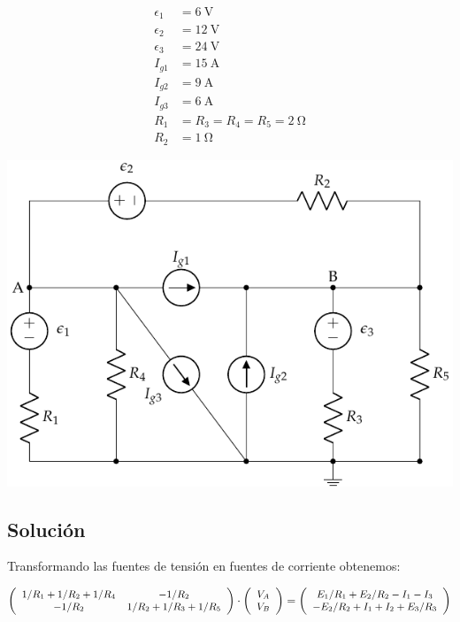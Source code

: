 \documentclass[10pt]{article}
\begin{document}
\begin{minipage}[c]{0.3\linewidth}
  \begin{align*}
    \epsilon_1&=\SI{6}{\volt}\\
    \epsilon_2&=\SI{12}{\volt}\\
    \epsilon_3&=\SI{24}{\volt}\\
    I_{g1} &= \SI{15}{\ampere}\\
    I_{g2} &= \SI{9}{\ampere}\\
    I_{g3} &= \SI{6}{\ampere}\\
    R_{1}&= R_3 = R_4 = R_5 = \SI{2}{\ohm}\\
    R_{2}&= \SI{1}{\ohm}
  \end{align*}
\end{minipage}
\begin{minipage}[c]{0.7\linewidth}
  \includegraphics{figs/nudos_fuentes.pdf}
\end{minipage}

\subsection*{Solución}


Transformando las fuentes de tensión en fuentes de corriente obtenemos:

\[
\small{
\left(\begin{array}{ccc}
    1/R_1 + 1/R_2 + 1/R_4 & -1/R_2\\
    -1/R_2 & 1/R_2 + 1/R_3 + 1/R_5
  \end{array}\right) \cdot \left(\begin{array}{c}
    V_{A}\\
    V_{B}
  \end{array}\right) = 
\left(\begin{array}{c}
        E_1/R_1 + E_2/R_2 - I_1 - I_3\\
        -E_2/R_2 + I_1 + I_2 + E_3/R_3
      \end{array}\right)
  }
\]
\end{document}
